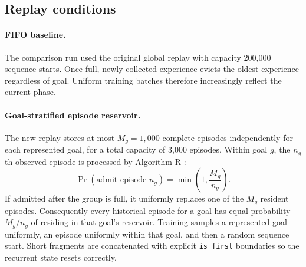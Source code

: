 \documentclass[10pt]{article}
\begin{document}
\subsection{Replay conditions}

\paragraph{FIFO baseline.}
The comparison run used the original global replay with capacity 200,000 sequence starts. Once full, newly collected experience evicts the oldest experience regardless of goal. Uniform training batches therefore increasingly reflect the current phase.

\paragraph{Goal-stratified episode reservoir.}
The new replay stores at most $M_g=1{,}000$ complete episodes independently for each represented goal, for a total capacity of 3,000 episodes. Within goal $g$, the $n_g$th observed episode is processed by Algorithm R \citep{vitter1985reservoir}:
\begin{equation}
 \Pr(\text{admit episode }n_g)=\min\left(1,\frac{M_g}{n_g}\right).
\end{equation}
If admitted after the group is full, it uniformly replaces one of the $M_g$ resident episodes. Consequently every historical episode for a goal has equal probability $M_g/n_g$ of residing in that goal's reservoir. Training samples a represented goal uniformly, an episode uniformly within that goal, and then a random sequence start. Short fragments are concatenated with explicit \texttt{is\_first} boundaries so the recurrent state resets correctly.
\end{document}
